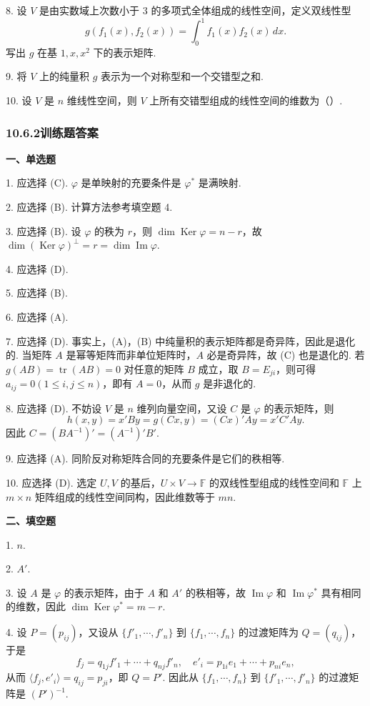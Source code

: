 \documentclass[UTF8,12pt,a4paper,fontset=fandol]{ctexart}
\begin{document}
8. 设 $V$ 是由实数域上次数小于 $3$ 的多项式全体组成的线性空间，定义双线性型
\[
g(f_1(x),f_2(x))=\int_0^1 f_1(x)f_2(x)\,dx.
\]
写出 $g$ 在基 $1,x,x^2$ 下的表示矩阵.

9. 将 $V$ 上的纯量积 $g$ 表示为一个对称型和一个交错型之和.

10. 设 $V$ 是 $n$ 维线性空间，则 $V$ 上所有交错型组成的线性空间的维数为（\quad ）.

\subsubsection*{10.6.2\quad 训练题答案}

\noindent\textbf{一、单选题}

1. 应选择 (C). $\varphi$ 是单映射的充要条件是 $\varphi^*$ 是满映射.

2. 应选择 (B). 计算方法参考填空题 4.

3. 应选择 (B). 设 $\varphi$ 的秩为 $r$，则 $\dim\operatorname{Ker}\varphi=n-r$，故 $\dim(\operatorname{Ker}\varphi)^\perp=r=\dim\operatorname{Im}\varphi$.

4. 应选择 (D).

5. 应选择 (B).

6. 应选择 (A).

7. 应选择 (D). 事实上，(A)，(B) 中纯量积的表示矩阵都是奇异阵，因此是退化的. 当矩阵 $A$ 是幂等矩阵而非单位矩阵时，$A$ 必是奇异阵，故 (C) 也是退化的. 若 $g(AB)=\operatorname{tr}(AB)=0$ 对任意的矩阵 $B$ 成立，取 $B=E_{ji}$，则可得 $a_{ij}=0(1\le i,j\le n)$，即有 $A=0$，从而 $g$ 是非退化的.

8. 应选择 (D). 不妨设 $V$ 是 $n$ 维列向量空间，又设 $C$ 是 $\varphi$ 的表示矩阵，则
\[
h(x,y)=x'By=g(Cx,y)=(Cx)'Ay=x'C'Ay.
\]
因此 $C=(BA^{-1})'=(A^{-1})'B'$.

9. 应选择 (A). 同阶反对称矩阵合同的充要条件是它们的秩相等.

10. 应选择 (D). 选定 $U,V$ 的基后，$U\times V\to\mathbb{F}$ 的双线性型组成的线性空间和 $\mathbb{F}$ 上 $m\times n$ 矩阵组成的线性空间同构，因此维数等于 $mn$.

\noindent\textbf{二、填空题}

1. $n$.

2. $A'$.

3. 设 $A$ 是 $\varphi$ 的表示矩阵，由于 $A$ 和 $A'$ 的秩相等，故 $\operatorname{Im}\varphi$ 和 $\operatorname{Im}\varphi^*$ 具有相同的维数，因此 $\dim\operatorname{Ker}\varphi^*=m-r$.

4. 设 $P=(p_{ij})$，又设从 $\{f'_1,\cdots,f'_n\}$ 到 $\{f_1,\cdots,f_n\}$ 的过渡矩阵为 $Q=(q_{ij})$，于是
\[
f_j=q_{1j}f'_1+\cdots+q_{nj}f'_n,\quad
e'_i=p_{1i}e_1+\cdots+p_{ni}e_n,
\]
从而 $\langle f_j,e'_i\rangle=q_{ij}=p_{ji}$，即 $Q=P'$. 因此从 $\{f_1,\cdots,f_n\}$ 到 $\{f'_1,\cdots,f'_n\}$ 的过渡矩阵是 $(P')^{-1}$.
\end{document}
